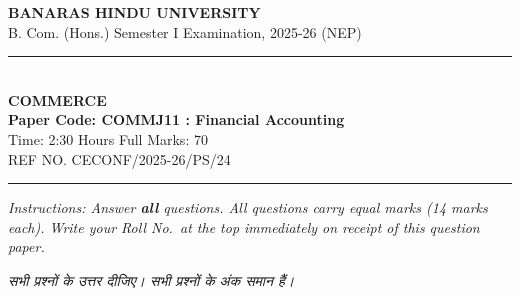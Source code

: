 \documentclass[11pt,a4paper]{article}
\begin{document}
\begin{center}
  {\large\bfseries BANARAS HINDU UNIVERSITY}\\[2pt]
  {\normalsize B. Com. (Hons.) Semester I Examination, 2025-26 (NEP)}\\[6pt]
  \rule{0.8\linewidth}{0.5pt}\\[6pt]
  {\large\bfseries COMMERCE}\\[4pt]
  {\large\bfseries Paper Code: COMMJ11 : Financial Accounting}\\[4pt]
  {\normalsize Time: 2:30 Hours \hfill Full Marks: 70}\\[2pt]
  {\small REF NO. CECONF/2025-26/PS/24}
\end{center}
\rule{\linewidth}{0.4pt}
\smallskip

\noindent \textit{Instructions: Answer \textbf{all} questions. All questions carry equal marks (14 marks each). Write your Roll No.\ at the top immediately on receipt of this question paper.}

\smallskip
\noindent \textit{सभी प्रश्नों के उत्तर दीजिए। सभी प्रश्नों के अंक समान हैं।}

\bigskip
\end{document}
